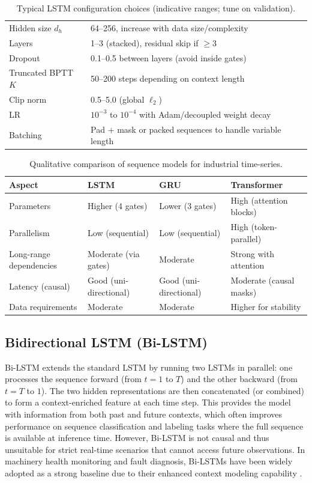 \begin{table}[t]
\centering
\caption{Typical LSTM configuration choices (indicative ranges; tune on validation).}
\label{tab:lstm_config}
\begin{tabular}{l l}
\hline
Hidden size \(d_h\) & 64--256, increase with data size/complexity \\
Layers & 1--3 (stacked), residual skip if \(\geq 3\) \\
Dropout & 0.1--0.5 between layers (avoid inside gates) \\
Truncated BPTT \(K\) & 50--200 steps depending on context length \\
Clip norm & 0.5--5.0 (global \(\ell_2\)) \\
LR & \(10^{-3}\) to \(10^{-4}\) with Adam/decoupled weight decay \\
Batching & Pad + mask or packed sequences to handle variable length \\
\hline
\end{tabular}
\end{table}

\begin{table}[t]
\centering
\caption{Qualitative comparison of sequence models for industrial time-series.}
\label{tab:model_compare}
\begin{tabular}{p{2.8cm} p{3.2cm} p{3.2cm} p{3.8cm}}
\hline
\textbf{Aspect} & \textbf{LSTM} & \textbf{GRU} & \textbf{Transformer} \\
\hline
Parameters & Higher (4 gates) & Lower (3 gates) & High (attention blocks) \\[0.5ex]
Parallelism & Low (sequential) & Low (sequential) & High (token-parallel) \\[0.5ex]
Long-range dependencies & Moderate (via gates) & Moderate & Strong with attention \\[0.5ex]
Latency (causal) & Good (uni-directional) & Good (uni-directional) & Moderate (causal masks) \\[0.5ex]
Data requirements & Moderate & Moderate & Higher for stability \\
\hline
\end{tabular}
\end{table}

\subsection{Bidirectional LSTM (Bi-LSTM)}
Bi-LSTM extends the standard LSTM by running two LSTMs in parallel: one processes the sequence forward (from \(t=1\) to \(T\)) and the other backward (from \(t=T\) to \(1\)). The two hidden representations are then concatenated (or combined) to form a context-enriched feature at each time step. This provides the model with information from both past and future contexts, which often improves performance on sequence classification and labeling tasks where the full sequence is available at inference time. However, Bi-LSTM is not causal and thus unsuitable for strict real-time scenarios that cannot access future observations. In machinery health monitoring and fault diagnosis, Bi-LSTMs have been widely adopted as a strong baseline due to their enhanced context modeling capability \cite{zhang2019deep, zhao2019deep}.

